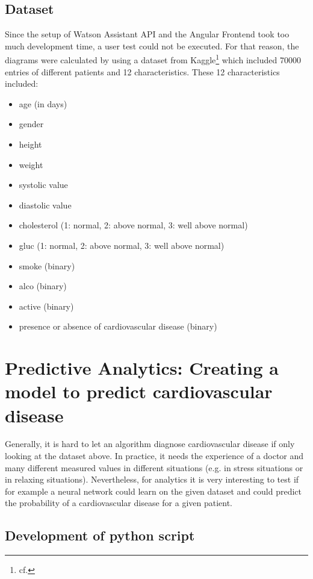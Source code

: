 \subsection{Dataset}
Since the setup of Watson Assistant API and the Angular Frontend took too much development time, a user test could not be executed. For that reason, the diagrams were calculated by using a dataset from Kaggle\footnote{cf.\autocite{kaggle}} which included 70000 entries of different patients and 12 characteristics. These 12 characteristics included:
\begin{itemize}
\setlength\itemsep{-0.5em}
  \item age (in days)
  \item gender
  \item height
  \item weight
  \item systolic value
  \item diastolic value
  \item cholesterol (1: normal, 2: above normal, 3: well above normal)
  \item gluc (1: normal, 2: above normal, 3: well above normal)
  \item smoke (binary)
  \item alco (binary)
  \item active (binary)
  \item presence or absence of cardiovascular disease (binary) 
\end{itemize}  


\section{Predictive Analytics: Creating a model to predict cardiovascular disease} \label{predict}
Generally, it is hard to let an algorithm diagnose cardiovascular disease if only looking at the dataset above. In practice, it needs the experience of a doctor and many different measured values in different situations (e.g. in stress situations or in relaxing situations). Nevertheless, for analytics it is very interesting to test if for example a neural network could learn on the given dataset and could predict the probability of a cardiovascular disease for a given patient. 

\subsection{Development of python script}

